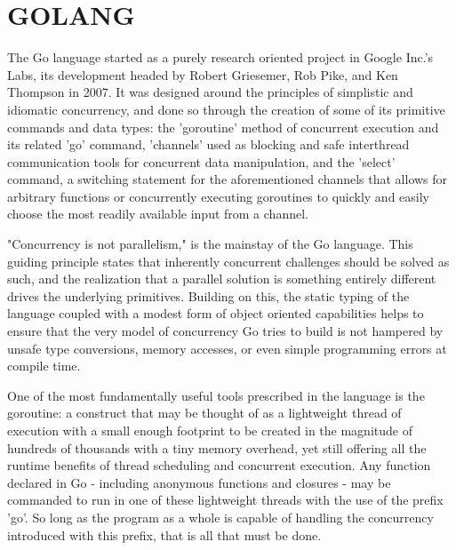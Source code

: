 \documentclass[report]{IEEEtran}
\begin{document}



\section{GOLANG}

The Go language started as a purely research oriented project in Google Inc.'s Labs, its development headed by Robert Griesemer, Rob Pike, and Ken Thompson in 2007. \cite{FAQ} It was designed around the principles of simplistic and idiomatic concurrency, and done so through the creation of some of its primitive commands and data types: the 'goroutine' method of concurrent execution and its related 'go' command, 'channels' used as blocking and safe interthread communication tools for concurrent data manipulation, and the 'select' command, a switching statement for the aforementioned channels that allows for arbitrary functions or concurrently executing goroutines to quickly and easily choose the most readily available input from a channel.

"Concurrency is not parallelism," \cite{FAQ} is the mainstay of the Go language. This guiding principle states that inherently concurrent challenges should be solved as such, and the realization that a parallel solution is something entirely different drives the underlying primitives. Building on this, the static typing of the language coupled with a modest form of object oriented capabilities helps to ensure that the very model of concurrency Go tries to build is not hampered by unsafe type conversions, memory accesses, or even simple programming errors at compile time.

One of the most fundamentally useful tools prescribed in the language is the goroutine: a construct that may be thought of as a lightweight thread of execution with a small enough footprint to be created in the magnitude of hundreds of thousands with a tiny memory overhead, yet still offering all the runtime benefits of thread scheduling and concurrent execution. Any function declared in Go - including anonymous functions and closures - may be commanded to run in one of these lightweight threads with the use of the prefix 'go'. So long as the program as a whole is capable of handling the concurrency introduced with this prefix, that is all that must be done.
\end{document}
